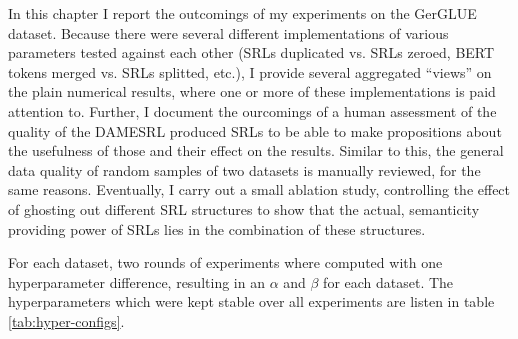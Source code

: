 \label{chap:5_results}


In this chapter I report the outcomings of my experiments on the GerGLUE dataset. Because there
were several different implementations of various parameters tested against each other (SRLs duplicated vs.
SRLs zeroed, BERT tokens merged vs. SRLs splitted, etc.), I provide several aggregated ``views'' on the
plain numerical results, where one or more of these implementations is paid attention to. Further, I
document the ourcomings of a human assessment of the quality of the DAMESRL produced SRLs to be able to
make propositions about the usefulness of those and their effect on the results. Similar to this, the
general data quality of random samples of two datasets is manually reviewed, for the same reasons.
Eventually, I carry out a small ablation study, controlling the effect of ghosting out different
SRL structures to show that the actual, semanticity providing power of SRLs lies in the combination
of these structures.

For each dataset, two
rounds of experiments where computed with one hyperparameter difference, resulting in
an $\alpha$ and $\beta$ for each dataset. The hyperparameters which were kept stable
over all experiments are listen in table \ref{tab:hyper-configs}.


